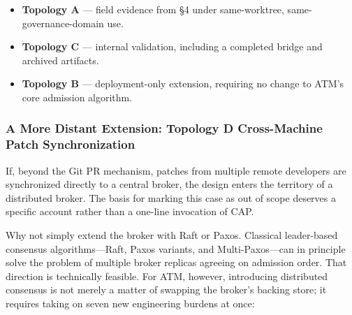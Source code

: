 \documentclass[9pt,letterpaper]{extarticle}
\begin{document}
\begin{itemize}
\item \textbf{Topology A} --- field evidence from §4 under same-worktree, same-governance-domain use.
\item \textbf{Topology C} --- internal validation, including a completed bridge and archived artifacts.
\item \textbf{Topology B} --- deployment-only extension, requiring no change to ATM's core admission algorithm.
\end{itemize}

\subsubsection*{A More Distant Extension: Topology D Cross-Machine Patch Synchronization}

If, beyond the Git PR mechanism, patches from multiple remote developers are synchronized directly to a central broker, the design enters the territory of a distributed broker. The basis for marking this case as {}out of scope{} deserves a specific account rather than a one-line invocation of CAP.

Why not simply extend the broker with Raft or Paxos. Classical leader-based consensus algorithms---Raft, Paxos variants, and Multi-Paxos---can in principle solve the problem of multiple broker replicas agreeing on admission order. That direction is technically feasible. For ATM, however, introducing distributed consensus is not merely a matter of swapping the broker's backing store; it requires taking on seven new engineering burdens at once:
\end{document}
